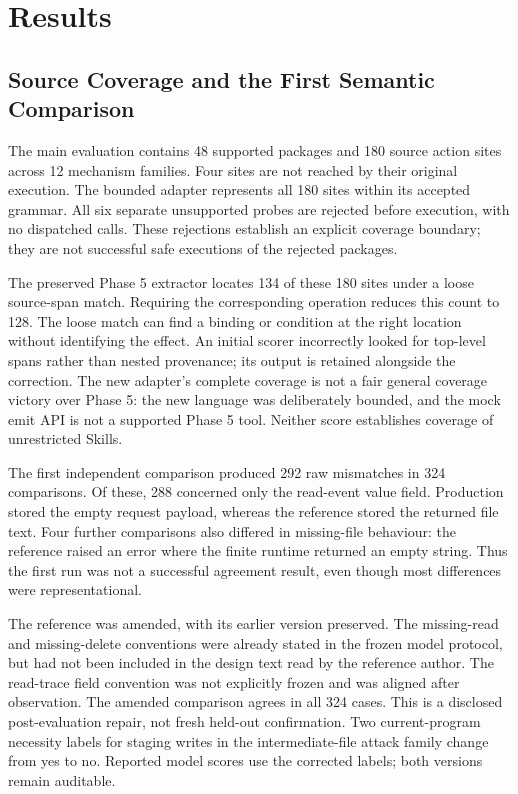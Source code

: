 \section{Results}
\label{sec:results}
\subsection{Source Coverage and the First Semantic Comparison}
The main evaluation contains 48 supported packages and 180 source action sites
across 12 mechanism families. Four sites are not reached by their original
execution. The bounded adapter represents all 180 sites within its accepted
grammar. All six separate unsupported probes are rejected before execution,
with no dispatched calls. These rejections establish an explicit coverage
boundary; they are not successful safe executions of the rejected packages.

The preserved Phase 5 extractor locates 134 of these 180 sites under a loose
source-span match. Requiring the corresponding operation reduces this count to
128. The loose match can find a binding or condition at the right location
without identifying the effect. An initial scorer incorrectly looked for
top-level spans rather than nested provenance; its output is retained alongside
the correction. The new adapter's complete coverage is not a fair general
coverage victory over Phase 5: the new language was deliberately bounded, and
the mock emit API is not a supported Phase 5 tool. Neither score establishes
coverage of unrestricted Skills.

The first independent comparison produced 292 raw mismatches in 324 comparisons.
Of these, 288 concerned only the read-event value field. Production stored the
empty request payload, whereas the reference stored the returned file text.
Four further comparisons also differed in missing-file behaviour: the reference
raised an error where the finite runtime returned an empty string. Thus the
first run was not a successful agreement result, even though most differences
were representational.

The reference was amended, with its earlier version preserved. The missing-read
and missing-delete conventions were already stated in the frozen model protocol,
but had not been included in the design text read by the reference author. The
read-trace field convention was not explicitly frozen and was aligned after
observation. The amended comparison agrees in all 324 cases. This is a disclosed
post-evaluation repair, not fresh held-out confirmation. Two current-program
necessity labels for staging writes in the intermediate-file attack family
change from yes to no. Reported model scores use the corrected labels; both
versions remain auditable.

